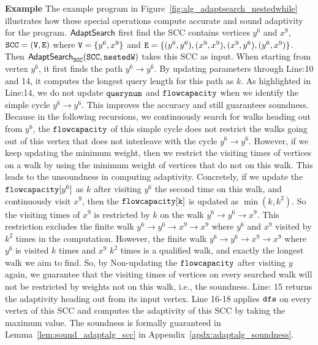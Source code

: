 \textbf{Example}
The example program in Figure~\ref{fig:alg_adaptsearch_nestedwhile} illustrates how these special
operations compute accurate and sound adaptivity for the program.
$\mathsf{AdaptSearch}$ first find the SCC contains vertices $y^6$ and $x^9$, $\mathtt{SCC} = (\mathtt{V}, \mathtt{E})$ where $\mathtt{V} = \{y^6, x^9\}$ and
$\mathtt{E} = \{(y^6, y^6), (x^9, x^9), (x^9, y^6), (y^6, x^9)\}$.
Then $\mathtt{\mathsf{AdaptSearch}_{SCC}(SCC, nestedW)}$ takes this SCC as input.
When starting from vertex $y^6$, it first finds the path $y^6 \to y^6$. By updating parameters through Line:10 and 14, it computes the longest query length for this path as 
$k$.
As highlighted in Line:14, we do not update
$\mathtt{querynum}$ and $\mathtt{flowcapacity}$ when we identify the simple cycle $y^6 \to y^6$.
This improves the accuracy and still guarantees soundness.
Because in the following recursions, we continuously search for walks heading out from $y^6$, 
the $\mathtt{flowcapacity}$ of this simple cycle does not restrict the walks going out of this vertex that does not interleave with the cycle $y^6 \to y^6$.
However, if we keep updating the minimum weight, then we
restrict the visiting times of vertices on a walk by
using the minimum weight of vertices that do not on this walk.
This leads to the unsoundness in computing adaptivity.
Concretely, if we update the $\mathtt{flowcapacity}[y^6]$ as $k$ after visiting $y^6$ the second time 
on this walk,
and continuously visit $x^9$,
then the $\mathtt{flowcapacity[k]}$ is 
updated as $\min(k, k^2)$.
So
the visiting times of $x^9$ is restricted by $k$ on the walk $y^6 \to y^6 \to x^9$.
This restriction excludes the finite walk $y^6 \to y^6 \to x^9 \to x^9$ where $y^6$ and $x^9$ visited by $k^2$ times
in the computation. 
However, the finite walk $y^6 \to y^6 \to x^9 \to x^9$ where $y^6$ is visited $k$ times and $x^9$ $k^2$ times is 
a qualified walk, and exactly the longest walk we aim to find. So, by Non-updating the $\mathtt{flowcapacity}$ after 
visiting $y$ again, we guarantee that the visiting times of vertices on every searched walk will not be restricted by weights not on this walk,
i.e., the soundness.
Line: 15 returns the adaptivity heading out from its input vertex.
Line 16-18 applies $\mathtt{dfs}$ on every vertex of this SCC and 
computes the adaptivity of this SCC by taking the maximum 
value.%
The soundness is formally guaranteed in Lemma~\ref{lem:sound_adaptalg_scc} in Appendix~\ref{apdx:adaptalg_soundness}.


